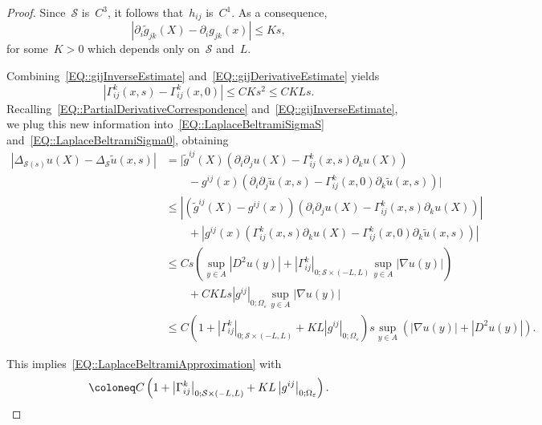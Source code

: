 \documentclass[12pt,a4paper]{amsart}
\makeatletter
\numberwithin{equation}{section}
\theoremstyle{definition}
\theoremstyle{remark}
\newcommand{\eps}{\varepsilon}
\newcommand{\abs}[1]{\left\lvert#1\right\rvert}
\renewcommand{\leq}{\leqslant}
\newcommand{\const}[1]{%
  \csname const@#1\endcsname%
}
\makeatother
\begin{document}
\begin{proof}
    Since~$\mathcal{S}$ is~$C^3$, it follows that~$h_{ij}$ is~$C^1$. As a consequence,
    \begin{equation}\label{EQ::gijDerivativeEstimate}
        \abs{\partial_i \tilde{g}_{jk}(X) - \partial_i g_{jk}(x)} \leq K s,
    \end{equation}
    for some~$K > 0$ which depends only on~$\mathcal{S}$ and~$L$.

    Combining~\eqref{EQ::gijInverseEstimate} and~\eqref{EQ::gijDerivativeEstimate} yields
    \begin{equation}
        \abs{\Gamma_{ij}^k(x,s) - \Gamma_{ij}^k(x,0)} \leq CK s^2 \leq CKL s.
    \end{equation}
    Recalling~\eqref{EQ::PartialDerivativeCorrespondence} and~\eqref{EQ::gijInverseEstimate}, we plug this new information into~\eqref{EQ::LaplaceBeltramiSigmaS} and~\eqref{EQ::LaplaceBeltramiSigma0}, obtaining
    \begin{align}
        \abs{\Delta_{\mathcal{S}(s)}u(X) - \Delta_\mathcal{S} \tilde{u}(x,s)} &= \big|\tilde{g}^{ij}(X) \left( \partial_i \partial_j u(X) - \Gamma_{ij}^k(x,s) \partial_k u(X) \right)\\
            &\qquad- g^{ij}(x) \left( \partial_i \partial_j \tilde{u}(x,s) - \Gamma_{ij}^k(x,0) \partial_k \tilde{u}(x,s)\right)\big|\\
            &\leq \abs{\left(\tilde{g}^{ij}(X) - g^{ij}(x)\right)\left( \partial_i \partial_j u(X) - \Gamma_{ij}^k(x,s) \partial_k u(X) \right)}\\
            &\qquad + \abs{g^{ij}(x)\left(\Gamma_{ij}^k(x,s) \partial_k u(X) - \Gamma_{ij}^k(x,0) \partial_k \tilde{u}(x,s) \right)}\\
            &\leq Cs\left(\sup_{y \in A}\abs{D^2 u(y)} + \abs{\Gamma_{ij}^k}_{0; \mathcal{S} \times (-L,L)} \sup_{y \in A}\abs{\nabla u(y)}\right)\\
            &\qquad + CKLs\abs{g^{ij}}_{0; \Omega_\eps}\sup_{y \in A}\abs{\nabla u(y)}\\
            &\leq C\left(1+\abs{\Gamma_{ij}^k}_{0; \mathcal{S} \times (-L,L)}+KL\abs{g^{ij}}_{0; \Omega_\eps}\right) s \sup_{y \in A} \left(\abs{\nabla u(y)} + \abs{D^2 u(y)}\right).
    \end{align}
    
    This implies~\eqref{EQ::LaplaceBeltramiApproximation} with
    \begin{equation}
        \const{CONST::LaplaceBeltramiApproximation} \coloneq C\left(1+\abs{\Gamma_{ij}^k}_{0; \mathcal{S} \times (-L,L)}+KL\abs{g^{ij}}_{0; \Omega_\eps}\right).\qedhere
    \end{equation}
\end{proof}
\end{document}
